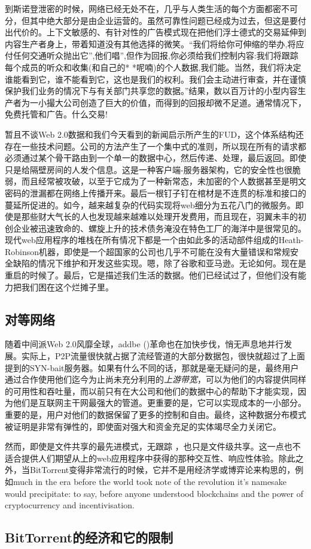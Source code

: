 到斯诺登泄密的时候，网络已经无处不在，几乎与人类生活的每个方面都密不可分，但其中绝大部分是由企业运营的。虽然可靠性问题已经成为过去，但这是要付出代价的。上下文敏感的、有针对性的广告模式现在把他们浮士德式的交易延伸到内容生产者身上，带着知道没有其他选择的微笑。“我们将给你可伸缩的举办,将应付任何交通听众抛出它”,他们唱”,但作为回报,你必须给我们控制内容:我们将跟踪每个成员的听众和收集(和自己的* *呢喃)的个人数据,我们能。当然，我们将决定谁能看到它，谁不能看到它，这也是我们的权利。我们会主动进行审查，并在谨慎保护我们业务的情况下与有关部门共享您的数据。”结果，数以百万计的小型内容生产者为一小撮大公司创造了巨大的价值，而得到的回报却微不足道。通常情况下，免费托管和广告。什么交易!

暂且不谈Web 2.0数据和我们今天看到的新闻启示所产生的FUD，这个体系结构还存在一些技术问题。公司的方法产生了一个集中式的准则，所以现在所有的请求都必须通过某个骨干路由到一个单一的数据中心，然后传递、处理，最后返回。即使只是给隔壁房间的人发个信息。这是一种客户端-服务器架构，它的安全性也很脆弱，而且经常被攻破，以至于它成为了一种新常态，未加密的个人数据甚至是明文密码的泄漏都在网络上传播开来。最后一根钉子钉在棺材是不连贯的标准和接口的蔓延所促进的。如今，越来越复杂的代码实现将web细分为五花八门的微服务。即使是那些财大气长的人也发现越来越难以处理开发费用，而且现在，羽翼未丰的初创企业被迅速致命的、螺旋上升的技术债务淹没在特色工厂的海洋中是很常见的。现代web应用程序的堆栈在所有情况下都是一个由如此多的活动部件组成的Heath-Robinson机器，即使是一个超国家的公司也几乎不可能在没有大量错误和常规安全缺陷的情况下维护和开发这些实现。嗯，除了谷歌和亚马逊。无论如何。现在是重启的时候了。最后，它是描述我们生活的数据。他们已经试过了，但他们没有能力把我们困在这个烂摊子里。


\subsection{对等网络\statusgreen}\label{sec:peer_to_peer}

随着中间派Web 2.0风靡全球，addbe ()革命也在加快步伐，悄无声息地并行发展。实际上，P2P流量很快就占据了流经管道的大部分数据包，很快就超过了上面提到的SYN-bait服务器。如果有什么不同的话，那就是毫无疑问的是，最终用户通过合作使用他们迄今为止尚未充分利用的\emph{上游带宽}，可以为他们的内容提供同样的可用性和吞吐量，而以前只有在大公司和他们的数据中心的帮助下才能实现，因为他们是互联网主干网最强大的管道。更重要的是，它可以实现成本的一小部分。重要的是，用户对他们的数据保留了更多的控制和自由。最终，这种数据分布模式被证明是非常有弹性的，即使面对强大和资金充足的实体竭尽全力关闭它。

然而，即使是文件共享的最先进模式，无跟踪 \cite{pouwelse2005bittorrent}，也只是文件级共享。这一点也不适合提供人们期望从上的web应用程序中获得的那种交互性、响应性体验。除此之外，当BitTorrent变得非常流行的时候，它并不是用经济学或博弈论来构思的，例如\very much in the era before the world took note of the revolution it's namesake would precipitate: to say, before anyone understood blockchains and the power of cryptocurrency and incentivisation.\subsection{BitTorrent的经济和它的限制}

